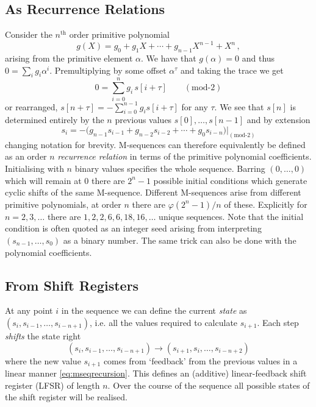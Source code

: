 \documentclass[twocolumn]{revtex4-2}
\begin{document}
\subsection{As Recurrence Relations}
Consider the $n^{\text{th}}$ order primitive polynomial
\begin{equation}
    g(X) = g_0 + g_1 X + \cdots + g_{n-1} X^{n-1} + X^n \, ,
\end{equation}
arising from the primitive element $\alpha$. We have that $g(\alpha) = 0$ and thus $0 = \sum_i g_i \alpha^i$. Premultiplying by some offset $\alpha^\tau$ and taking the trace we get 
\begin{equation}
    0 = \sum_{i=0}^n g_i \, s[i+\tau] \qquad (\text{mod-}2)
\end{equation}
or rearranged, $s[n+\tau] = - \sum_{i=0}^{n-1} g_i s[i+\tau]$ for any $\tau$. 
We see that $s[n]$ is determined entirely by the $n$ previous values $s[0], \ldots, s[n-1]$ and by extension
\begin{equation}
\label{eq:mseqrecursion}
    s_i = -  \big( g_{n-1} s_{i-1} + g_{n-2} s_{i-2}
    + \cdots + g_0 s_{i-n} \big) |_{(\text{mod-}2)}
\end{equation}
changing notation for brevity. M-sequences can therefore equivalently be defined as an order $n$ \emph{recurrence relation} in terms of the primitive polynomial coefficients.
Initialising with $n$ binary values specifies the whole sequence. Barring $(0,\ldots,0)$ which will remain at $0$ there are $2^n-1$ possible initial conditions which generate cyclic shifts of the same M-sequence. 
Different M-sequences arise from different primitive polynomials, at order $n$ there are $\varphi(2^n-1)/n$ of these. Explicitly for $n=2,3, \ldots$ there are $1,2,2,6,6,18,16, \ldots$ unique sequences.
Note that the initial condition is often quoted as an integer seed arising from interpreting $(s_{n-1}, \ldots, s_{0})$ as a binary number. The same trick can also be done with the polynomial coefficients.

\subsection{From Shift Registers}
At any point $i$ in the sequence we can define the current \emph{state} as $(s_{i}, s_{i-1}, \ldots, s_{i-n+1})$, i.e. all the values required to calculate $s_{i+1}$.
Each step \emph{shifts} the state right
\begin{equation}
    (s_{i}, s_{i-1}, \ldots, s_{i-n+1}) \longrightarrow (s_{i+1}, s_{i}, \ldots, s_{i-n+2})
\end{equation}
where the new value $s_{i+1}$ comes from `feedback' from the previous values in a linear manner \eqref{eq:mseqrecursion}. 
This defines an (additive) linear-feedback shift register (LFSR) of length $n$. Over the course of the sequence all possible states of the shift register will be realised.
\end{document}
